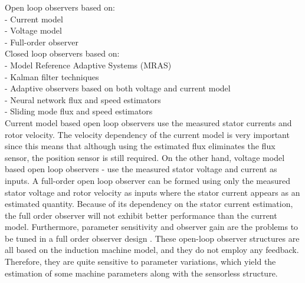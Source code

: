 Open loop observers based on:\\
- Current model\\
- Voltage model\\
- Full-order observer\\


Closed loop observers based on:\\
- Model Reference Adaptive Systems (MRAS)\\
- Kalman filter techniques\\
- Adaptive observers based on both voltage and current model\\
- Neural network flux and speed estimators\\
- Sliding mode flux and speed estimators\\

Current model based open loop observers use the measured stator currents and rotor velocity. The velocity dependency of the current model is very important since this means that although using the estimated flux eliminates the flux sensor, the position sensor is still required. On the other hand, voltage model based open loop observers \cite{M}-\cite{gc} use the measured stator voltage and current as inputs. A full-order open loop observer can be formed using only the measured stator voltage and rotor velocity as inputs where the stator current appears as an estimated quantity. Because of its dependency on the stator current estimation, the full order observer will not exhibit better performance than the current model. Furthermore, parameter sensitivity and observer gain are the problems to be tuned in a full order observer design \cite{br}. These open-loop observer structures are all based on the induction machine model, and they do not employ any feedback. Therefore, they are quite sensitive to parameter variations, which yield the estimation of some machine parameters along with the sensorless structure.\\
\vspace{1cm}\\

